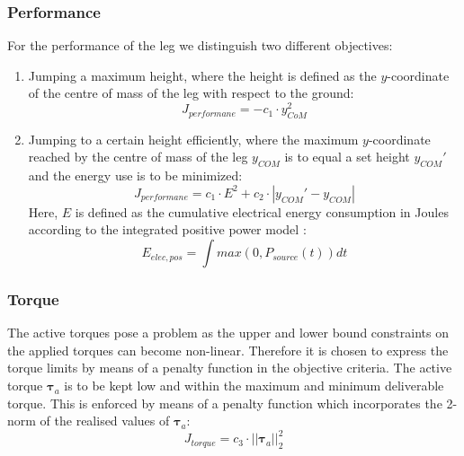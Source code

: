 \documentclass[letterpaper, 10 pt, conference]{ieeeconf}  %
\begin{document}
\subsubsection{Performance}
For the performance of the leg we distinguish two different objectives: 
\begin{enumerate}
	\item Jumping a maximum height, where the height is defined as the $y$-coordinate of the centre of mass of the leg with respect to the ground:
 \begin{equation}
	J_{performane} = -c_1 \cdot y_{CoM}^2
 \end{equation}
	\item Jumping to a certain height efficiently, where the maximum $y$-coordinate reached by the centre of mass of the leg $y_{COM}$ is to equal a set height $y_{COM}'$ and the energy use is to be minimized:
 \begin{equation}
	J_{performane} =  c_1 \cdot E^2 + c_2 \cdot |y_{COM}'-y_{COM}|
 \end{equation}
	Here, $E$ is defined as the cumulative electrical energy consumption in Joules according to the integrated positive power model \cite{verstraten2016energy}:
	 \begin{equation}
	E_{elec,pos} = \int max(0,P_{source}(t))dt
	\end{equation}
\end{enumerate}

\subsubsection{Torque}
The active torques pose a problem as the upper and lower bound constraints on the applied torques can become non-linear. Therefore it is chosen to express the torque limits by means of a penalty function in the objective criteria.
The active torque $\boldsymbol{\tau}_a$ is to be kept low and within the maximum and minimum deliverable torque. This is enforced by means of a penalty function which incorporates the 2-norm of the realised values of $\boldsymbol{\tau}_a$:  
 \begin{equation}
J_{torque}= c_3 \cdot || \boldsymbol{\tau}_a ||_2^2
 \end{equation}
\end{document}
